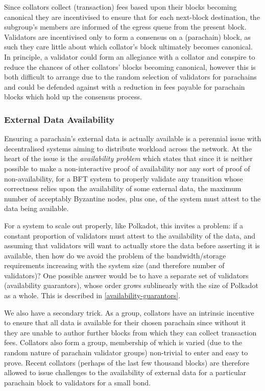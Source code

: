 \documentclass[usepdftitle=false]{beamer}
\begin{document}
\begin{frame}
 Since collators collect (transaction) fees based upon their blocks becoming canonical they are incentivised to ensure that for each next-block destination, the subgroup's members are informed of the egress queue from the present block. Validators are incentivised only to form a consensus on a (parachain) block, as such they care little about which collator's block ultimately becomes canonical. In principle, a validator could form an allegiance with a collator and conspire to reduce the chances of other collators' blocks becoming canonical, however this is both difficult to arrange due to the random selection of validators for parachains and could be defended against with a reduction in fees payable for parachain blocks which hold up the consensus process.

\subsubsection{External Data Availability}

 Ensuring a parachain's external data is actually available is a perennial issue with decentralised systems aiming to distribute workload across the network. At the heart of the issue is the \textit{availability problem} which states that since it is neither possible to make a non-interactive proof of availability nor any sort of proof of non-availability, for a BFT system to properly validate any transition whose correctness relies upon the availability of some external data, the maximum number of acceptably Byzantine nodes, plus one, of the system must attest to the data being available.

 For a system to scale out properly, like Polkadot, this invites a problem: if a constant proportion of validators must attest to the availability of the data, and assuming that validators will want to actually store the data before asserting it is available, then how do we avoid the problem of the bandwidth/storage requirements increasing with the system size (and therefore number of validators)? One possible answer would be to have a separate set of validators (availability guarantors), whose order grows sublinearly with the size of Polkadot as a whole. This is described in \ref{availability-guarantors}.

 We also have a secondary trick. As a group, collators have an intrinsic incentive to ensure that all data is available for their chosen parachain since without it they are unable to author further blocks from which they can collect transaction fees. Collators also form a group, membership of which is varied (due to the random nature of parachain validator groups) non-trivial to enter and easy to prove. Recent collators (perhaps of the last few thousand blocks) are therefore allowed to issue challenges to the availability of external data for a particular parachain block to validators for a small bond.


\end{frame}
\end{document}
